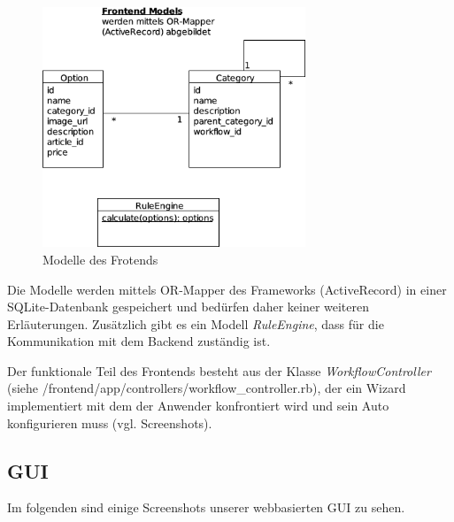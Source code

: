 \documentclass[a4paper,10pt]{article}
\begin{document}
\begin{center}
  \begin{figure}[t]
    \includegraphics[width=0.7\textwidth]{doc/frontend_models.png}
    \caption{Modelle des Frotends}
    \label{frontend_models}
  \end{figure}
\end{center}

Die Modelle werden mittels OR-Mapper des Frameworks (ActiveRecord) in einer SQLite-Datenbank gespeichert und bedürfen daher keiner weiteren Erläuterungen.
Zusätzlich gibt es ein Modell \textit{RuleEngine}, dass für die Kommunikation mit dem Backend zuständig ist.

Der funktionale Teil des Frontends besteht aus der Klasse \textit{WorkflowController} (siehe /frontend/app/controllers/workflow\_controller.rb), der ein Wizard implementiert mit dem der Anwender konfrontiert wird und sein Auto konfigurieren muss (vgl. Screenshots).

\subsection*{GUI}

Im folgenden sind einige Screenshots unserer webbasierten GUI zu sehen.
\end{document}

